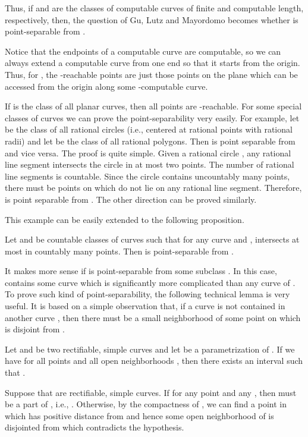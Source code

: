 \documentclass{LMCS}
\theoremstyle{plain}
\begin{document}
\noindent Thus, if  and  are the classes of computable curves of finite and computable length, respectively, then, the question of Gu, Lutz and Mayordomo becomes whether  is point-separable from .

Notice that the endpoints of a computable curve are computable, so we can always extend a computable curve from one end so that it starts from the origin. Thus, for  , the -reachable points are just those points on the plane which can be accessed from the origin along some -computable curve.

If  is the class of all planar curves, then all points are -reachable. For some special classes of curves we can prove the point-separability very easily. For example, let  be the class of all rational circles (i.e., centered at rational points with rational radii) and let  be the class of all rational polygons. Then  is point separable from  and vice versa. The proof is quite simple. Given a rational circle , any rational line segment intersects the circle  in at most two points. The number of rational line segments is countable. Since the circle  contains uncountably many points, there must be points on  which do not lie on any rational line segment. Therefore,  is point separable from . The other direction can be proved similarly.

This example can be easily extended to the following proposition.

\begin{prop}\label{prop-p-sep-simple-case}
Let  and  be countable classes of curves such that for any curve  and ,  intersects  at most in countably many points. Then  is point-separable from .
\end{prop}

It makes more sense if  is point-separable from some subclass . In this case,  contains some curve which is significantly more complicated than any curve of . To prove such kind of point-separability, the following technical lemma is very useful. It is based on a simple observation that, if a curve  is not contained in another curve , then there must be a small neighborhood of some point on  which is disjoint from .

\begin{lem}\label{lem-two-curves}
Let  and  be two rectifiable, simple curves and let  be a parametrization of . If we have  for all points  and all open neighborhoods , then there exists an interval  such that .
\end{lem}
\proof
Suppose that  are rectifiable, simple curves. If  for any point  and any , then  must be a part of , i.e., . Otherwise, by the compactness of , we can find a point  in  which has positive distance from  and hence some open neighborhood of  is disjointed from  which contradicts the hypothesis.
\end{document}
